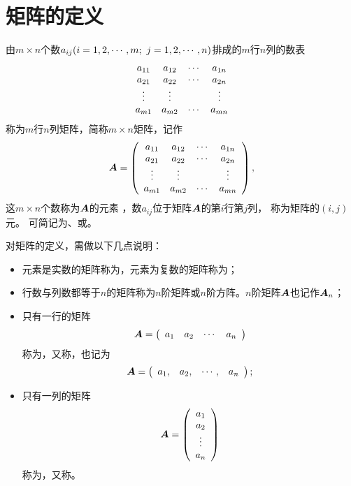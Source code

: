 \section{矩阵的定义}
\begin{frame}
\begin{dingyi}
  由$m\times n$个数$a_{ij}(i=1,2,\cdots,m; \ j = 1, 2, \cdots, n)$排成的$m$行$n$列的数表
  $$
  \begin{array}{cccc}
    a_{11} & a_{12} & \cdots & a_{1n}\\
    a_{21} & a_{22} & \cdots & a_{2n}\\
    \vdots    & \vdots   &     & \vdots \\
    a_{m1} & a_{m2} & \cdots & a_{mn}\\
  \end{array}
  $$
  称为$m$行$n$列矩阵，简称$m \times n$矩阵，记作
  $$
  {\boldsymbol{A}} = \left(
    \begin{array}{cccc}
      a_{11} & a_{12} & \cdots & a_{1n}\\
      a_{21} & a_{22} & \cdots & a_{2n}\\
      \vdots    & \vdots   &     & \vdots \\
      a_{m1} & a_{m2} & \cdots & a_{mn}\\
    \end{array}
  \right),
  $$
  这$m \times n$个数称为$\boldsymbol{A}$的元素
  ，数$a_{ij}$位于矩阵$\boldsymbol{A}$的第$i$行第$j$列，
  称为矩阵的$(i,j)$元。 可简记为、或。
\end{dingyi}
\end{frame}

\begin{frame}
  对矩阵的定义，需做以下几点说明：
  \begin{itemize}
  \item 
    元素是实数的矩阵称为，元素为复数的矩阵称为；
  \item
    行数与列数都等于$n$的矩阵称为$n$阶矩阵或$n$阶方阵。$n$阶矩阵$\boldsymbol{A}$也记作$\boldsymbol{A}_n$；
  \item
    只有一行的矩阵
    $$
    \boldsymbol{A} = \left(
      \begin{array}{cccc}
        a_1 & a_2 & \cdots & a_n
      \end{array}
    \right )
    $$
    称为，又称，也记为
    $$
    \boldsymbol{A} = \left(
      \begin{array}{cccc}
        a_1, & a_2, & \cdots, & a_n
      \end{array}
    \right );
    $$
  \item
    只有一列的矩阵
    $$
    \boldsymbol{A} = \left(
      \begin{array}{c}
        a_1 \\
        a_2 \\
        \vdots \\
        a_n
      \end{array}
    \right )
    $$
    称为，又称。
  \end{itemize}

\end{frame}

